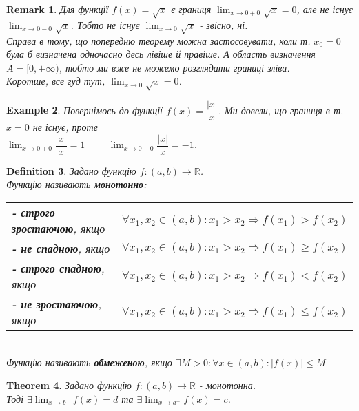 \documentclass[a4paper, 14pt]{article}
\theoremstyle{theoremdd}
\newtheorem{theorem}{Theorem}[subsection]
\theoremstyle{theoremdd}
\newtheorem{definition}[theorem]{Definition}
\theoremstyle{theoremdd}
\theoremstyle{theoremdd}
\newtheorem{example}[theorem]{Example}
\theoremstyle{theoremdd}
\theoremstyle{theoremdd}
\newtheorem{remark}[theorem]{Remark}
\theoremstyle{theoremdd}
\theoremstyle{theoremdd}
\begin{document}
\begin{remark}
Для функції $f(x) = \sqrt{x}$ є границя $\displaystyle\lim_{x \to 0+0} \sqrt{x} = 0$, але не існує $\displaystyle\lim_{x \to 0-0} \sqrt{x}$. Тобто не існує $\displaystyle\lim_{x \to 0} \sqrt{x}$ - звісно, ні.\\
Справа в тому, що попередню теорему можна застосовувати, коли т. $x_0 = 0$ була б визначена одночасно десь лівіше й правіше. А область визначення $A = [0,+\infty)$, тобто ми вже не можемо розглядати границі зліва.\\
Коротше, все гуд тут, $\displaystyle\lim_{x \to 0} \sqrt{x} = 0$.
\end{remark}

\begin{example}
Повернімось до функції $f(x) = \dfrac{|x|}{x}$. Ми довели, що границя в т. $x=0$ не існує, проте\\
$\displaystyle\lim_{x \to 0+0} \dfrac{|x|}{x} = 1 \hspace{1cm} \lim_{x \to 0-0} \dfrac{|x|}{x} = -1$.
\end{example}

\begin{definition}
Задано функцію $f: (a,b) \to \mathbb{R}$.\\
Функцію називають \textbf{монотонно}:\\
\begin{tabular}{ll}
\textbf{- строго зростаючою}, якщо & $\forall x_1,x_2 \in (a,b): x_1 > x_2 \Rightarrow f(x_1)>f(x_2)$\\
\textbf{- не спадною}, якщо & $\forall x_1,x_2 \in (a,b): x_1 > x_2 \Rightarrow f(x_1) \geq f(x_2)$\\
\textbf{- строго спадною}, якщо & $\forall x_1,x_2 \in (a,b): x_1 > x_2 \Rightarrow f(x_1) < f(x_2)$\\
\textbf{- не зростаючою}, якщо & $\forall x_1,x_2 \in (a,b): x_1 > x_2 \Rightarrow f(x_1) \leq f(x_2)$
\end{tabular}\\
Функцію називають \textbf{обмеженою}, якщо $\exists M>0: \forall x \in (a,b): |f(x)| \leq M$
\end{definition}

\begin{theorem}
Задано функцію $f: (a,b) \to \mathbb{R}$ - монотонна.\\
Тоді $\displaystyle \exists \lim_{x \to b^-} f(x) = d$ та $\displaystyle \exists \lim_{x \to a^+} f(x) = c$.
\end{theorem}
\end{document}
